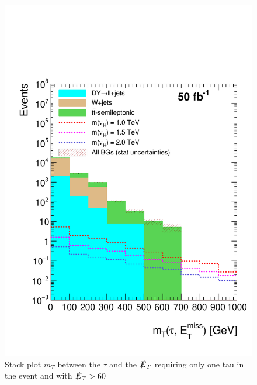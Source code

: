 \begin{figure}[H]
\centering
\includegraphics[width=\linewidth]{StackPlots/mT_1Tau_met60_50ifb.pdf}
\caption{Stack plot $m_{T}$ between the $\tau$ and the $\slashed{E}_{T}$ requiring only one tau in the event and with $\slashed{E}_{T} > 60$}
\label{fig: mT1tauMet60}
\end{figure}










